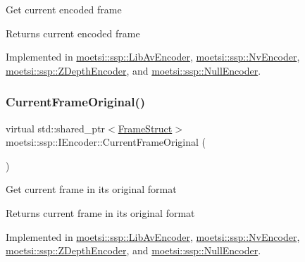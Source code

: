 Get current encoded frame \begin{DoxyReturn}{Returns}
current encoded frame 
\end{DoxyReturn}


Implemented in \hyperlink{classmoetsi_1_1ssp_1_1LibAvEncoder_aedb37703d73b55f1389a122d2ecbe923}{moetsi\+::ssp\+::\+Lib\+Av\+Encoder}, \hyperlink{classmoetsi_1_1ssp_1_1NvEncoder_adbc7d498e797af8c5bb31b5a2a82efdd}{moetsi\+::ssp\+::\+Nv\+Encoder}, \hyperlink{classmoetsi_1_1ssp_1_1ZDepthEncoder_a075752f62bbc40f71026812c5548ef5f}{moetsi\+::ssp\+::\+Z\+Depth\+Encoder}, and \hyperlink{classmoetsi_1_1ssp_1_1NullEncoder_ae48926f99c368849ee8822aed10ac1b5}{moetsi\+::ssp\+::\+Null\+Encoder}.

\mbox{\label{classmoetsi_1_1ssp_1_1IEncoder_ab60bdaae0a85289dfa31a12bab533dc0}} 
\subsubsection{\texorpdfstring{Current\+Frame\+Original()}{CurrentFrameOriginal()}\hspace{0.1cm}{\footnotesize\ttfamily [1/2]}}
{\footnotesize\ttfamily virtual std\+::shared\+\_\+ptr$<$\hyperlink{structmoetsi_1_1ssp_1_1FrameStruct}{Frame\+Struct}$>$ moetsi\+::ssp\+::\+I\+Encoder\+::\+Current\+Frame\+Original (\begin{DoxyParamCaption}{ }\end{DoxyParamCaption})\hspace{0.3cm}{\ttfamily [pure virtual]}}

Get current frame in its original format \begin{DoxyReturn}{Returns}
current frame in its original format 
\end{DoxyReturn}


Implemented in \hyperlink{classmoetsi_1_1ssp_1_1LibAvEncoder_a249c65ad557f438d6856e875f01a1947}{moetsi\+::ssp\+::\+Lib\+Av\+Encoder}, \hyperlink{classmoetsi_1_1ssp_1_1NvEncoder_a56baf331eae448da89ee54b69fec170c}{moetsi\+::ssp\+::\+Nv\+Encoder}, \hyperlink{classmoetsi_1_1ssp_1_1ZDepthEncoder_abe5820ee0dea5fec22e398a7ba4d6777}{moetsi\+::ssp\+::\+Z\+Depth\+Encoder}, and \hyperlink{classmoetsi_1_1ssp_1_1NullEncoder_ad972dfdb93d2f609cdc885c53079ede2}{moetsi\+::ssp\+::\+Null\+Encoder}.

